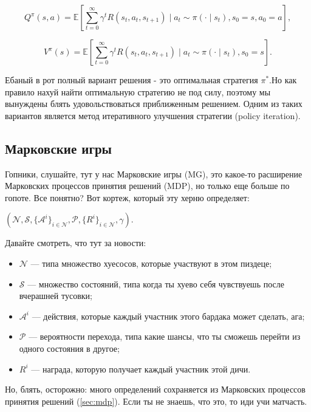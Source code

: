 \begin{equation}
	Q^{\pi}(s, a) = \mathbb{E} \left[ \sum_{t=0}^{\infty} \gamma^t R(s_t, a_t, s_{t+1}) \mid a_t \sim \pi(\cdot \mid s_t), s_0 = s, a_0 = a \right],
	\label{eq:V}
\end{equation}


\begin{equation}
	V^{\pi}(s) = \mathbb{E} \left[ \sum_{t=0}^{\infty} \gamma^t R(s_t, a_t, s_{t+1}) \mid a_t \sim \pi(\cdot \mid s_t), s_0 = s \right].
\end{equation}

Ебаный в рот полный вариант решения - это оптимальная стратегия  \(\pi^*\).Но как правило нахуй найти оптимальную стратегию не под силу, поэтому мы вынуждены блять удовольствоваться приближенным решением. Одним из таких вариантов является метод итеративного улучшения стратегии (policy iteration).

\subsection{Марковские игры} \label{sec:markov-games}

Гопники, слушайте, тут у нас Марковские игры (MG), это какое-то расширение Марковских процессов принятия решений (MDP), но только еще больше по гопоте. Все понятно? Вот кортеж, который эту херню определяет:

\((\mathcal{N}, \mathcal{S}, \{\mathcal{A}^i\}_{i \in \mathcal{N}}, \mathcal{P}, \{R^i\}_{i \in \mathcal{N}}, \gamma)\).

Давайте смотреть, что тут за новости:
\begin{itemize}[label=---]
	\item \(\mathcal{N}\) --- типа множество хуесосов, которые участвуют в этом пиздеце;
	\item \(\mathcal{S}\) --- множество состояний, типа когда ты хуево себя чувствуешь после вчерашней тусовки;
	\item \(\mathcal{A}^i\) ---  действия, которые каждый участник этого бардака может сделать, ага;
	\item \(\mathcal{P}\) --- вероятности перехода, типа какие шансы, что ты сможешь перейти из одного состояния в другое;
	\item \(R^i\) --- награда, которую получает каждый участник этой дичи.
\end{itemize}

Но, блять, осторожно: много определений сохраняется из Марковских процессов принятия решений (\ref{sec:mdp}). Если ты не знаешь, что это, то иди учи матчасть.

